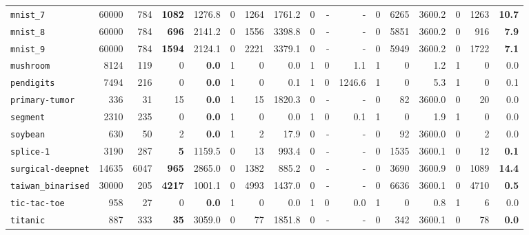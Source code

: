 \begin{tabular}{lccrrrrrrrrrrrrrr}
\texttt{mnist\_7} & \multicolumn{1}{r}{60000} & \multicolumn{1}{r}{784}  & \textbf{1082} & 1276.8 & 0 & 1264 & 1761.2 & 0 & - & - & 0 & 6265 & 3600.2 & 0 & 1263 & \textbf{10.7}\\
\texttt{mnist\_8} & \multicolumn{1}{r}{60000} & \multicolumn{1}{r}{784}  & \textbf{696} & 2141.2 & 0 & 1556 & 3398.8 & 0 & - & - & 0 & 5851 & 3600.2 & 0 & 916 & \textbf{7.9}\\
\texttt{mnist\_9} & \multicolumn{1}{r}{60000} & \multicolumn{1}{r}{784}  & \textbf{1594} & 2124.1 & 0 & 2221 & 3379.1 & 0 & - & - & 0 & 5949 & 3600.2 & 0 & 1722 & \textbf{7.1}\\
\texttt{mushroom} & \multicolumn{1}{r}{8124} & \multicolumn{1}{r}{119}  & 0 & \textbf{0.0} & 1 & 0 & 0.0 & 1 & 0 & 1.1 & 1 & 0 & 1.2 & 1 & 0 & 0.0\\
\texttt{pendigits} & \multicolumn{1}{r}{7494} & \multicolumn{1}{r}{216}  & 0 & \textbf{0.0} & 1 & 0 & 0.1 & 1 & 0 & 1246.6 & 1 & 0 & 5.3 & 1 & 0 & 0.1\\
\texttt{primary-tumor} & \multicolumn{1}{r}{336} & \multicolumn{1}{r}{31}  & 15 & \textbf{0.0} & 1 & 15 & 1820.3 & 0 & - & - & 0 & 82 & 3600.0 & 0 & 20 & 0.0\\
\texttt{segment} & \multicolumn{1}{r}{2310} & \multicolumn{1}{r}{235}  & 0 & \textbf{0.0} & 1 & 0 & 0.0 & 1 & 0 & 0.1 & 1 & 0 & 1.9 & 1 & 0 & 0.0\\
\texttt{soybean} & \multicolumn{1}{r}{630} & \multicolumn{1}{r}{50}  & 2 & \textbf{0.0} & 1 & 2 & 17.9 & 0 & - & - & 0 & 92 & 3600.0 & 0 & 2 & 0.0\\
\texttt{splice-1} & \multicolumn{1}{r}{3190} & \multicolumn{1}{r}{287}  & \textbf{5} & 1159.5 & 0 & 13 & 993.4 & 0 & - & - & 0 & 1535 & 3600.1 & 0 & 12 & \textbf{0.1}\\
\texttt{surgical-deepnet} & \multicolumn{1}{r}{14635} & \multicolumn{1}{r}{6047}  & \textbf{965} & 2865.0 & 0 & 1382 & 885.2 & 0 & - & - & 0 & 3690 & 3600.9 & 0 & 1089 & \textbf{14.4}\\
\texttt{taiwan\_binarised} & \multicolumn{1}{r}{30000} & \multicolumn{1}{r}{205}  & \textbf{4217} & 1001.1 & 0 & 4993 & 1437.0 & 0 & - & - & 0 & 6636 & 3600.1 & 0 & 4710 & \textbf{0.5}\\
\texttt{tic-tac-toe} & \multicolumn{1}{r}{958} & \multicolumn{1}{r}{27}  & 0 & \textbf{0.0} & 1 & 0 & 0.0 & 1 & 0 & 0.0 & 1 & 0 & 0.8 & 1 & 6 & 0.0\\
\texttt{titanic} & \multicolumn{1}{r}{887} & \multicolumn{1}{r}{333}  & \textbf{35} & 3059.0 & 0 & 77 & 1851.8 & 0 & - & - & 0 & 342 & 3600.1 & 0 & 78 & \textbf{0.0}\\

\end{tabular}
